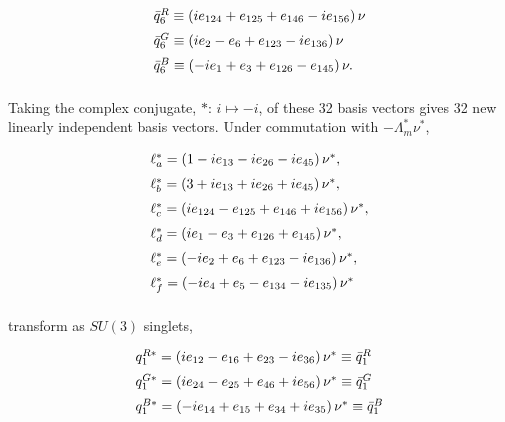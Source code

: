 \documentclass[letterpaper,12pt,titlepage,oneside,final]{book}
\newcommand{\spacer}{0.2cm}
\begin{document}
\begin{equation}\begin{array}{l}\label{triplet6}
\bar{q}^R_{6}\equiv\left(ie_{124}+e_{125}+e_{146}-ie_{156}\right)\nu   \vspace{\spacer} \\
\bar{q}^G_{6}\equiv\left(ie_{2}-e_{6}+e_{123}-ie_{136}\right)\nu   \vspace{\spacer} \\
\bar{q}^B_{6}\equiv\left(-ie_{1}+e_{3}+e_{126}-e_{145}\right)\nu.   \vspace{\spacer} \\
\end{array}\end{equation}

Taking the complex conjugate, $*$: $i\mapsto-i$, of these 32 basis vectors gives 32 new linearly independent basis vectors. Under commutation with $-\Lambda_m^* \nu^*$,

\begin{equation}\begin{array}{l}\label{antilept}
\ell_{a}^*=\left(1-ie_{13}-ie_{26}-ie_{45}\right)\nu^*, \vspace{\spacer}\\
  \ell_{b}^*=\left(3+ie_{13}+ie_{26}+ie_{45}\right)\nu^*, \vspace{\spacer}\\
\ell_{c}^*= \left(ie_{124}-e_{125}+e_{146}+ie_{156}\right)\nu^*, \vspace{\spacer} \\
\ell_{d}^*= \left(ie_{1}-e_{3}+e_{126}+e_{145}\right)\nu^*, \vspace{\spacer} \\
\ell_{e}^*= \left(-ie_{2}+e_{6}+e_{123}-ie_{136}\right)\nu^*, \vspace{\spacer} \\
\ell_{f}^*= \left(-ie_{4}+e_{5}-e_{134}-ie_{135}\right)\nu^* \vspace{\spacer} \\
\end{array}\end{equation}

\noindent transform as $SU(3)$ singlets,

\begin{equation}\begin{array}{l}\label{antitriplet}
q^{R*}_{1}=\left(ie_{12}-e_{16}+e_{23}-ie_{36}\right)\nu^* \equiv\bar{q}^R_1   \vspace{\spacer} \\
q^{G*}_{1}=\left(ie_{24}-e_{25}+e_{46}+ie_{56}\right)\nu^* \equiv\bar{q}^G_1 \vspace{\spacer} \\
q^{B*}_{1}=\left(-ie_{14}+e_{15}+e_{34}+ie_{35}\right)\nu^* \equiv\bar{q}^B_1 \vspace{\spacer} \\
\end{array}\end{equation}
\end{document}
